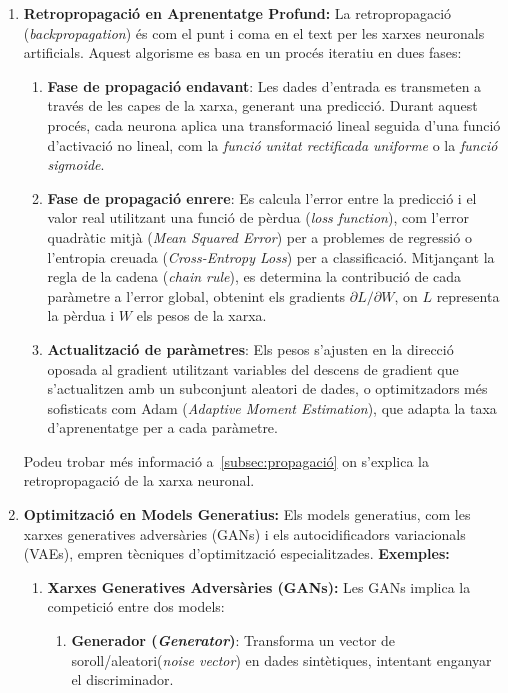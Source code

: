 \begin{enumerate}
 \item \textbf{Retropropagació en Aprenentatge Profund:} La retropropagació (\textit{backpropagation}) és com el punt i coma en el text per les xarxes neuronals artificials. Aquest algorisme es basa en un procés iteratiu en dues fases:
    \begin{enumerate}
       \item \textbf{Fase de propagació endavant}: Les dades d'entrada es transmeten a través de les capes de la xarxa, generant una predicció. Durant aquest procés, cada neurona aplica una transformació lineal seguida d'una funció d'activació no lineal, com la \textit{funció unitat rectificada uniforme} o la \textit{funció sigmoide}.
     \item \textbf{Fase de propagació enrere}: Es calcula l'error entre la predicció i el valor real utilitzant una funció de pèrdua (\textit{loss function}), com l'error quadràtic mitjà (\textit{Mean Squared Error}) per a problemes de regressió o l'entropia creuada (\textit{Cross-Entropy Loss}) per a classificació. Mitjançant la regla de la cadena (\textit{chain rule}), es determina la contribució de cada paràmetre a l'error global, obtenint els gradients $\partial L/\partial W$, on $L$ representa la pèrdua i $W$ els pesos de la xarxa.
     \item \textbf{Actualització de paràmetres}: Els pesos s'ajusten en la direcció oposada al gradient utilitzant variables del descens de gradient que s'actualitzen amb un subconjunt aleatori de dades, o optimitzadors més sofisticats com Adam (\textit{Adaptive Moment Estimation}), que adapta la taxa d'aprenentatge per a cada paràmetre.
    \end{enumerate}
Podeu trobar més informació a~\ref{subsec:propagació} on s'explica la retropropagació de la xarxa neuronal.

 \item \textbf{Optimització en Models Generatius:} Els models generatius, com les xarxes generatives adversàries (GANs) i els autocidificadors variacionals (VAEs), empren tècniques d'optimització especialitzades.
 \textbf{Exemples:}
     \begin{enumerate}
      \item \textbf{Xarxes Generatives Adversàries (GANs):} Les GANs implica la competició entre dos models:
          \begin{enumerate}
           \item \textbf{Generador (\textit{Generator})}: Transforma un vector de soroll/aleatori(\textit{noise vector}) en dades sintètiques, intentant enganyar el discriminador.


\end{enumerate}
\end{enumerate}
\end{enumerate}
